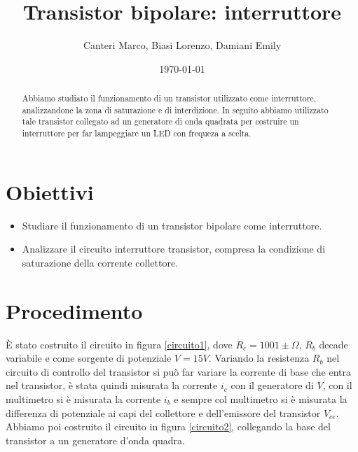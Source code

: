 \documentclass[letterpaper,11pt]{article}
\title{\textbf{Transistor bipolare:} interruttore}
\author{Canteri Marco, Biasi Lorenzo, Damiani Emily}
\date{\today}
\begin{document}
\maketitle

\begin{abstract}
\hspace{-1.5em}Abbiamo studiato il funzionamento di un transistor utilizzato come interruttore, analizzandone la zona di saturazione e di interdizione. In seguito abbiamo utilizzato tale transistor collegato ad un generatore di onda quadrata per costruire un interruttore per far lampeggiare un LED con frequeza a scelta.
\end{abstract}

\begin{body}
\section{Obiettivi}
\begin{itemize}
\item Studiare il funzionamento di un transistor bipolare come interruttore.
\item Analizzare il circuito interruttore transistor, compresa la condizione di saturazione della
corrente collettore.
\end{itemize}
\section{Procedimento}
È stato costruito il circuito in figura \eqref{circuito1}, dove $R_c = 1001 \pm \Omega$, $R_b$ decade variabile e come sorgente di potenziale $V=15 V$. Variando la resistenza $R_b$ nel circuito di controllo del transistor si può far variare la corrente di base che entra nel transistor, è stata quindi misurata la corrente $i_c$ con il generatore di $V$, con il multimetro si è misurata la corrente $i_b$ e sempre col multimetro si è misurata la differenza di potenziale ai capi del collettore e dell'emissore del transistor $V_{ce}$.
Abbiamo poi costruito il circuito in figura \eqref{circuito2}, collegando la base del transistor a un generatore d'onda quadra.


\end{body}
\end{document}
